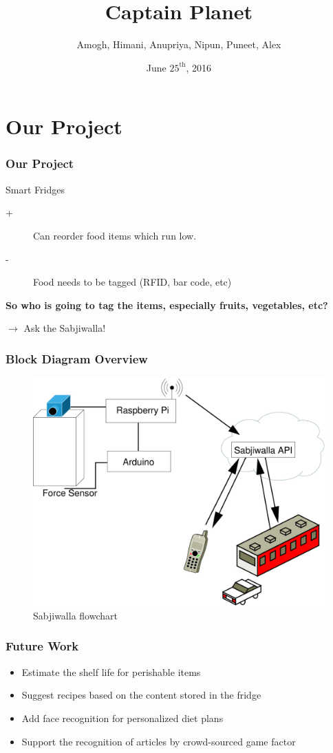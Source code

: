 \documentclass[aspectratio=1610]{beamer}
\title{Captain Planet}
\subtitle{\sabsi}
\date{June $25^{\text{th}}$, 2016}
\author[Amogh, Himani, Anupriya, Nipun, Puneet, Alex]{Amogh, Himani, Anupriya, Nipun, Puneet, Alex}
\newcommand{\sabsi}{Sabjiwalla\xspace}
\begin{document}
\begin{frame}
	\maketitle
\end{frame}


\section{Our Project}
\begin{frame}
	\frametitle{Our Project}
	Smart Fridges
	\begin{description}
		\item[+] Can reorder food items which run low.
		\item[-] Food needs to be tagged (RFID, bar code, etc)
	\end{description}
	\vspace{1cm} 
	\textbf{So who is going to tag the items, especially fruits, vegetables, etc?}
	
	$\rightarrow$ Ask the \sabsi!
\end{frame}


\begin{frame}
	\frametitle{Block Diagram Overview}
	\begin{figure}
		\centering
		\includegraphics[scale=0.4]{flowChart}
		\caption{\sabsi flowchart}
	\end{figure}
	
\end{frame}



\begin{frame}
	\frametitle{Future Work}
	\begin{itemize}
		\item Estimate the shelf life for perishable items
		\item Suggest recipes based on the content stored in the fridge
		\item Add face recognition for personalized diet plans
		\item Support the recognition of articles by crowd-sourced game factor
	\end{itemize}
\end{frame}
\end{document}
